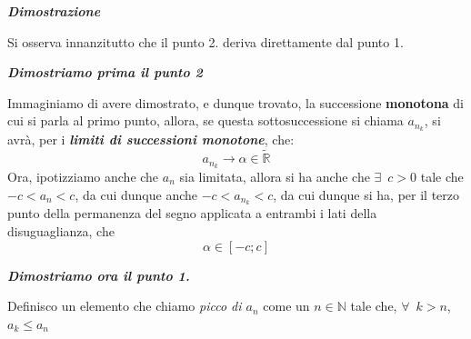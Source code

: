 \documentclass{article}
\theoremstyle{definition}
\begin{document}
\begin{center}
    \textbf{\textit{Dimostrazione}}
\end{center}
    Si osserva innanzitutto che il punto 2. deriva direttamente dal punto 1.
    \begin{center}
        \textbf{\textit{Dimostriamo prima il punto 2}}
    \end{center}
    Immaginiamo di avere dimostrato, e dunque trovato, la successione \textbf{monotona} di cui si parla al primo punto, allora, se questa sottosuccessione si chiama $a_{n_k}$, si avrà, per i \textbf{\textit{limiti di successioni monotone}}, che:
    \begin{equation}
        a_{n_k} \longrightarrow \alpha \in \widetilde{\mathbb{R}}
    \end{equation}
    Ora, ipotizziamo anche che $a_n$ sia limitata, allora si ha anche che $\exists \,\,\, c>0$ tale che $-c<a_n<c$, da cui dunque anche $-c<a_{n_k}<c$, da cui dunque si ha, per il terzo punto della permanenza del segno applicata a entrambi i lati della disuguaglianza, che
    \begin{equation}
        \alpha \in [-c;c]
    \end{equation}
    \begin{center}
        \textbf{\textit{Dimostriamo ora il punto 1.}}
    \end{center}
    Definisco un elemento che chiamo \textit{picco di $a_n$} come un $n \in \mathbb{N}$ tale che, $\forall \,\,\, k>n$, $a_k \leqslant a_n$
\end{document}
